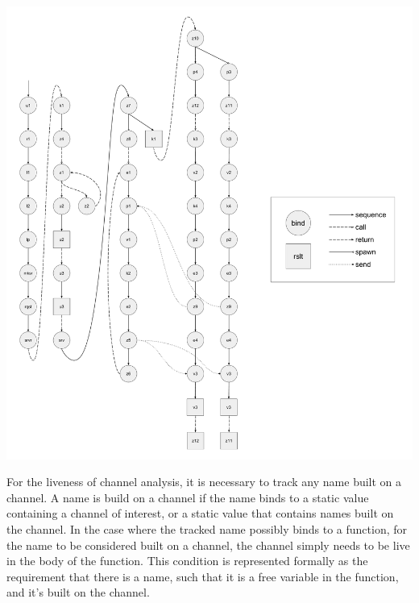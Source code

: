\documentclass[10pt]{article}
\begin{document}
\includegraphics[width=1\textwidth]{cml-graph-lp.pdf}


For the liveness of channel analysis, it is necessary to track any name built on a channel.
A name is build on a channel if the name binds to a static value 
containing a channel of interest, or a static value that contains names built on the channel.
In the case where the tracked name possibly binds to a function,
for the name to be considered built on a channel,
the channel simply needs to be live in the body of the function.
This condition is represented formally as the requirement that there is a 
name, such that it is a free variable in the function, and it's built on the channel.
\end{document}
